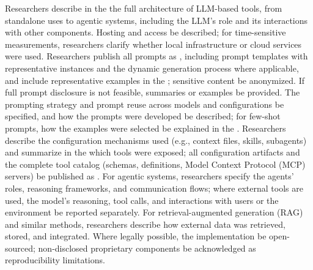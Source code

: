 Researchers \must describe in the \paper the full architecture of LLM-based tools, from standalone uses to agentic systems, including the LLM's role and its interactions with other components. Hosting and access \should be described; for time-sensitive measurements, researchers \must clarify whether local infrastructure or cloud services were used. Researchers \must publish all prompts as \supplementarymaterial, including prompt templates with representative instances and the dynamic generation process where applicable, and \must include representative examples in the \paper; sensitive content \must be anonymized. If full prompt disclosure is not feasible, summaries or examples \should be provided. The prompting strategy and prompt reuse across models and configurations \must be specified, and how the prompts were developed \should be described; for few-shot prompts, how the examples were selected \must be explained in the \paper. Researchers \must describe the configuration mechanisms used (e.g., context files, skills, subagents) and summarize in the \paper which tools were exposed; all configuration artifacts and the complete tool catalog (schemas, definitions, Model Context Protocol (MCP) servers) \should be published as \supplementarymaterial. For agentic systems, researchers \must specify the agents' roles, reasoning frameworks, and communication flows; where external tools are used, the model's reasoning, tool calls, and interactions with users or the environment \must be reported separately. For retrieval-augmented generation (RAG) and similar methods, researchers \must describe how external data was retrieved, stored, and integrated. Where legally possible, the implementation \should be open-sourced; non-disclosed proprietary components \must be acknowledged as reproducibility limitations.
